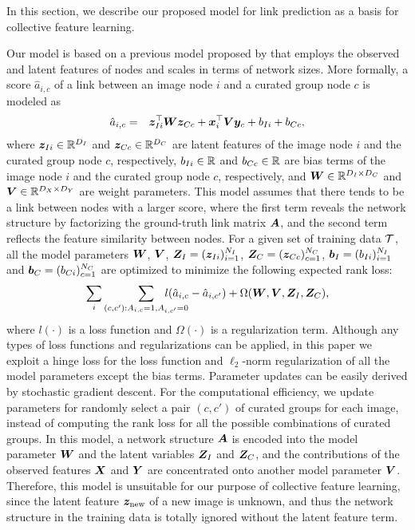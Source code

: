 \documentclass[letterpaper]{article} %
\begin{document}
In this section, we describe our proposed model for link prediction as a basis for collective feature learning.

Our model is based on a previous model proposed by \cite{Menon2011} that employs the observed and latent features of nodes and scales in terms of network sizes.
More formally, a score $\hat{a}_{i,c}$ of a link between an image node $i$ and a curated group node $c$ is modeled as
\begin{eqnarray}
  \hat{a}_{i,c} &=& \bm{z}_{Ii}^{\top}\bm{W}\bm{z}_{Cc} + \bm{x}_i^{\top}\bm{V}\bm{y}_c + b_{Ii} + b_{Cc},
  \label{eq:linkscore:old}
\end{eqnarray}
where $\bm{z}_{Ii}\in\mathbb R^{D_I}$ and $\bm{z}_{Cc}\in\mathbb R^{D_C}$ are latent features of the image node $i$ and the curated group node $c$, respectively, $b_{Ii}\in\mathbb R$ and $b_{Cc}\in\mathbb R$ are bias terms of the image node $i$ and the curated group node $c$, respectively, and $\bm{W}\in\mathbb R^{D_I\times D_C}$ and $\bm{V}\in\mathbb R^{D_X\times D_Y}$ are weight parameters.
This model assumes that there tends to be a link between nodes with a larger score, where the first term reveals the network structure by factorizing the ground-truth link matrix $\bm{A}$, and the second term reflects the feature similarity between nodes.
For a given set of training data $\mathcal T$, all the model parameters $\bm{W}$, $\bm{V}$, $\bm{Z}_I=(\bm{z}_{Ii})_{i=1}^{N_I}$, $\bm{Z}_C=(\bm{z}_{Cc})_{c=1}^{N_C}$, $\bm{b}_I=(b_{Ii})_{i=1}^{N_I}$ and $\bm{b}_C=(b_{Ci})_{c=1}^{N_C}$ are optimized to minimize the following expected rank loss:
\begin{eqnarray}
  \sum_i \sum_{(c,c'):A_{i,c}=1,A_{i,c'}=0}
    \hspace{-8mm}l(\hat{a}_{i,c}-\hat{a}_{i,c'}) + \Omega(\W, \V, \Z_I, \Z_C),
  \label{eq:linkloss}
\end{eqnarray}
where $l(\cdot)$ is a loss function and $\Omega(\cdot)$ is a regularization term.
Although any types of loss functions and regularizations can be applied, in this paper we exploit a hinge loss for the loss function and $\ell_2$-norm regularization of all the model parameters except the bias terms.
Parameter updates can be easily derived by stochastic gradient descent.
For the computational efficiency, we update parameters for randomly select a pair $(c,c')$ of curated groups for each image, instead of computing the rank loss for all the possible combinations of curated groups.
In this model, a network structure $\bm{A}$ is encoded into the model parameter $\bm{W}$ and the latent variables $\bm{Z}_I$ and $\bm{Z}_C$, and the contributions of the observed features $\bm{X}$ and $\bm{Y}$ are concentrated onto another model parameter $\bm{V}$.
Therefore, this model is unsuitable for our purpose of collective feature learning, since the latent feature $\bm{z}_{\rm{new}}$ of a new image is unknown, and thus the network structure in the training data is totally ignored without the latent feature term.
\end{document}
